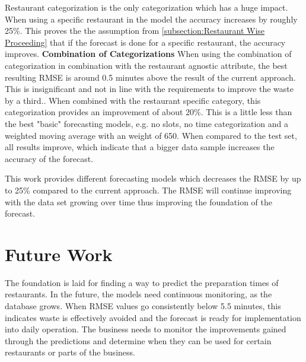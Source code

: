 Restaurant categorization is the only categorization which has a huge impact. When using a specific restaurant in the model the accuracy increases by roughly 25\%. This proves the the assumption from \ref{subsection:Restaurant Wise Proceeding} that if the forecast is done for a specific restaurant, the accuracy improves.
\newline\textbf{Combination of Categorizations}\newline
When using the combination of categorization in combination with the restaurant agnostic attribute, the best resulting RMSE is around 0.5 minutes above the result of the current approach. This is insignificant and not in line with the requirements to improve the waste by a third..\newline
When combined with the restaurant specific category, this categorization provides an improvement of about 20\%. This is a little less than the best "basic" forecasting models, e.g. no slots, no time categorization and a weighted moving average with an weight of 650. When compared to the test set, all results improve, which indicate that a bigger data sample increases the accuracy of the forecast.

\newline\newline
This work provides different forecasting models which decreases the RMSE by up to 25\% compared to the current approach. The RMSE will continue improving with the data set growing over time thus improving the foundation of the forecast.
\section{Future Work}
The foundation is laid for finding a way to predict the preparation times of restaurants. In the future, the models need continuous monitoring, as the database grows. When RMSE values go consistently below 5.5 minutes, this indicates waste is effectively avoided and the forecast is ready for implementation into daily operation.\newline
The business needs to monitor the improvements gained through the predictions and determine when they can be used for certain restaurants or parts of the business.
